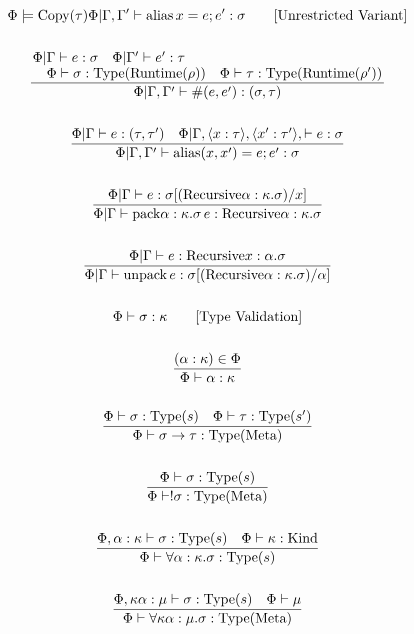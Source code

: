 \documentclass {article}
\begin{document}
\begin{gather*}
{{{ \Phi \models \text{Copy}(\tau)}}}
{\Phi | \Gamma, \Gamma' \vdash \text{alias} \, x = e; e' : \sigma} \tag*{[Unrestricted Variant]}\\
\\
\frac
{\splitfrac{\Phi | \Gamma \vdash e : \sigma \quad \Phi | \Gamma' \vdash e' : \tau}
{\Phi \vdash \sigma : \text{Type}(\text{Runtime}(\rho)) \quad \Phi \vdash \tau : \text{Type}(\text{Runtime}(\rho')) }}
{\Phi | \Gamma, \Gamma' \vdash \#(e, e') : (\sigma, \tau) } \\
\\
\frac
{\Phi | \Gamma \vdash e : (\tau, \tau') \quad \Phi | \Gamma , \langle x : \tau \rangle, \langle x' : \tau' \rangle,  \vdash e : \sigma  }
{\Phi | \Gamma, \Gamma' \vdash \text{alias} (x, x') = e; e' : \sigma} \\
\\
\frac
{\Phi | \Gamma \vdash e :  \sigma [(\text{Recursive} \alpha : \kappa. \sigma ) /x] }
{\Phi | \Gamma \vdash \text{pack} \alpha : \kappa. \sigma  \, e : \text{Recursive} \alpha : \kappa. \sigma} \\
\\
\frac
{\Phi | \Gamma \vdash e : \text{Recursive} x : \alpha. \sigma }
{\Phi | \Gamma \vdash \text{unpack} \, e : \sigma [(\text{Recursive} \alpha : \kappa. \sigma ) /\alpha]} \\
\\
\Phi \vdash \sigma : \kappa \tag* {[\text{Type Validation}]} \\
\\
\frac
{(\alpha : \kappa) \in \Phi}
{\Phi \vdash \alpha : \kappa} \\
\\
\frac
{\Phi \vdash \sigma : \text{Type} (s) \quad \Phi \vdash \tau : \text{Type} (s')}
{\Phi \vdash \sigma \to \tau : \text{Type} (\text{Meta})} \\
\\
\frac
{\Phi \vdash \sigma : \text{Type} (s)}
{\Phi \vdash !\sigma : \text{Type} (\text{Meta})} \\
\\
\frac
{\Phi, \alpha : \kappa \vdash \sigma : \text{Type}(s) \quad \Phi \vdash \kappa : \text{Kind}}
{\Phi \vdash \forall \alpha : \kappa. \sigma : \text{Type} (s) } \\
\\
\frac
{\Phi, \kappa \alpha : \mu \vdash \sigma : \text{Type} (s) \quad \Phi \vdash \mu  }
{\Phi \vdash \forall \kappa \alpha : \mu. \sigma : \text{Type} (\text{Meta}) } \\
\\

\end{gather*}
\end{document}
